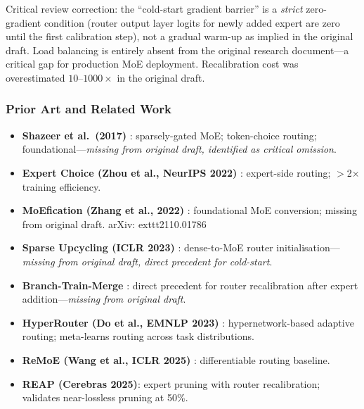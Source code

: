 \documentclass[11pt]{article}
\begin{document}
Critical review correction: the ``cold-start gradient barrier'' is a \emph{strict} zero-gradient condition (router output layer logits for newly added expert are zero until the first calibration step), not a gradual warm-up as implied in the original draft.
Load balancing is entirely absent from the original research document---a critical gap for production MoE deployment.
Recalibration cost was overestimated $10$--$1000\times$ in the original draft.

\subsubsection*{Prior Art and Related Work}
\begin{itemize}
  \item \textbf{Shazeer et al.\ (2017)} \cite{Shazeer2017}: sparsely-gated MoE; token-choice routing; foundational---\emph{missing from original draft, identified as critical omission}.

  \item \textbf{Expert Choice (Zhou et al., NeurIPS 2022)} \cite{ZhouLepikhinEtAl2022}: expert-side routing; $>$2$\times$ training efficiency.

  \item \textbf{MoEfication (Zhang et al., 2022)} \cite{ZhangEtAl2022MoEfication}: foundational MoE conversion; missing from original draft.
    arXiv:	exttt{2110.01786}

  \item \textbf{Sparse Upcycling (ICLR 2023)} \cite{KomatsuzakiEtAl2022}: dense-to-MoE router initialisation---\emph{missing from original draft, direct precedent for cold-start}.

  \item \textbf{Branch-Train-Merge} \cite{BTXRef}: direct precedent for router recalibration after expert addition---\emph{missing from original draft}.

  \item \textbf{HyperRouter (Do et al., EMNLP 2023)} \cite{DoEtAl2023}: hypernetwork-based adaptive routing; meta-learns routing across task distributions.

  \item \textbf{ReMoE (Wang et al., ICLR 2025)} \cite{WangZhuEtAl2024}: differentiable routing baseline.

  \item \textbf{REAP (Cerebras 2025)}: expert pruning with router recalibration; validates near-lossless pruning at 50\%.


\end{itemize}
\end{document}
